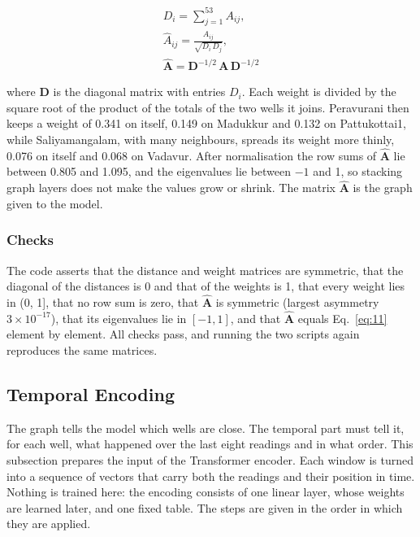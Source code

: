 \documentclass[conference]{IEEEtran}
\begin{document}
\begin{equation}
\begin{gathered}
D_i = \sum_{j=1}^{53} A_{ij}, \\
\hat{A}_{ij} = \frac{A_{ij}}{\sqrt{D_i\, D_j}}, \\
\hat{\mathbf{A}} = \mathbf{D}^{-1/2}\,\mathbf{A}\,\mathbf{D}^{-1/2}
\end{gathered}\label{eq:11}
\end{equation}

where \(\mathbf{D}\) is the diagonal matrix with entries \(D_i\). Each weight is divided by the square root of the product of the totals of the two wells it joins. Peravurani then keeps a weight of 0.341 on itself, 0.149 on Madukkur and 0.132 on Pattukottai1, while Saliyamangalam, with many neighbours, spreads its weight more thinly, 0.076 on itself and 0.068 on Vadavur. After normalisation the row sums of \(\hat{\mathbf{A}}\) lie between 0.805 and 1.095, and the eigenvalues lie between \(-1\) and 1, so stacking graph layers does not make the values grow or shrink. The matrix \(\hat{\mathbf{A}}\) is the graph given to the model.

\subsubsection{Checks}

The code asserts that the distance and weight matrices are symmetric, that the diagonal of the distances is 0 and that of the weights is 1, that every weight lies in (0, 1{]}, that no row sum is zero, that \(\hat{\mathbf{A}}\) is symmetric (largest asymmetry \(3 \times 10^{-17}\)), that its eigenvalues lie in \([-1, 1]\), and that \(\hat{\mathbf{A}}\) equals Eq.~\eqref{eq:11} element by element. All checks pass, and running the two scripts again reproduces the same matrices.

\subsection{Temporal Encoding}

The graph tells the model which wells are close. The temporal part must tell it, for each well, what happened over the last eight readings and in what order. This subsection prepares the input of the Transformer encoder. Each window is turned into a sequence of vectors that carry both the readings and their position in time. Nothing is trained here: the encoding consists of one linear layer, whose weights are learned later, and one fixed table. The steps are given in the order in which they are applied.
\end{document}
